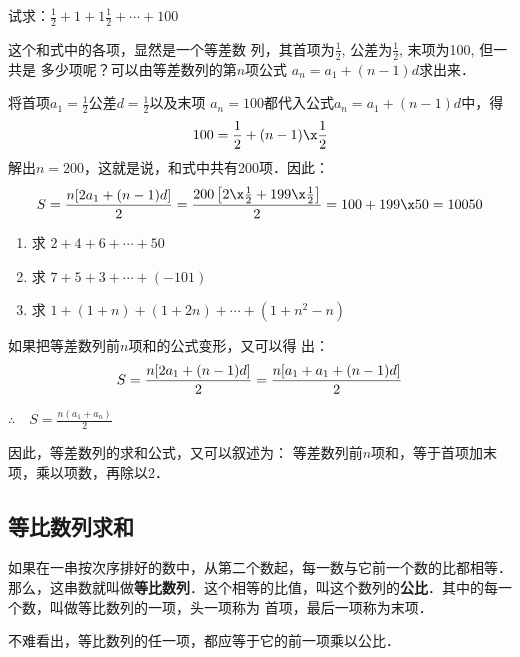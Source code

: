 \begin{example}
    试求：$\frac{1}{2}+1+1\frac{1}{2}+\cdots+100$
\end{example}

\begin{analyze}
这个和式中的各项，显然是一个等差数
列，其首项为$\frac{1}{2}$, 公差为$\frac{1}{2}$,
末项为100, 但一共是
多少项呢？可以由等差数列的第$n$项公式 $a_n=a_1+(n-1)d$求出来．

\end{analyze}

\begin{solution}
将首项$a_1=\frac{1}{2}$公差$d=\frac{1}{2}$以及末项
$a_n=100$都代入公式$a_n=a_1+(n-1)d$中，得
\[100=\frac{1}{2}+(n-1)\x \frac{1}{2}\]
解出$n=200$，这就是说，和式中共有200项．因此：
\[
    S=\frac{n[2a_1+(n-1)d]}{2}\\
    =\frac{200\left[2\x\frac{1}{2}+199\x \frac{1}{2}\right]}{2}\\
    =100+199\x 50=10050
\]
\end{solution}

\begin{ex}
\begin{enumerate}
    \item 求 $2+4+6+\cdots+50$
    \item 求 $7+5+3+\cdots+(-101)$
    \item 求 $1+(1+n)+(1+2n)+\cdots+(1+n^2-n)$
\end{enumerate}
\end{ex}

如果把等差数列前$n$项和的公式变形，又可以得
出：
\[
    S=\frac{n[2a_1+(n-1)d]}{2}\\
    =\frac{n[a_1+a_1+(n-1)d]}{2}
\]

$\therefore\quad S=\frac{n(a_1+a_n)}{2}$

因此，等差数列的求和公式，又可以叙述为：
等差数列前$n$项和，等于首项加末项，乘以项数，再除以2．

\subsection{等比数列求和}
如果在一串按次序排好的数中，从第二个数起，每一数与它前一个数的比都相等．那么，这串数就叫做\textbf{等比数列}．这个相等的比值，叫这个数列的\textbf{公比}．其中的每一个数，叫做等比数列的一项，头一项称为
首项，最后一项称为末项．

不难看出，等比数列的任一项，都应等于它的前一项乘以公比．

